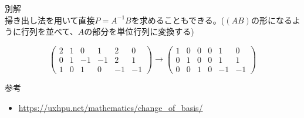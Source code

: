 \documentclass{jlreq}
\begin{document}
\begin{problem}
  別解 \\
  掃き出し法を用いて直接$P = A^{-1} B$を求めることもできる。($(A B)$の形になるように行列を並べて、$A$の部分を単位行列に変換する)

  \begin{equation*}
    \begin{pmatrix}
      2 & 1 & 0 & 1 & 2 & 0 \\
      0 & 1 & -1 & -1 & 2 & 1 \\
      1 & 0 & 1 & 0 & -1 & -1
    \end{pmatrix} \to \begin{pmatrix}
      1 & 0 & 0 & 0 & 1 & 0 \\
      0 & 1 & 0 & 0 & 1 & 1 \\
      0 & 0 & 1 & 0 & -1 & -1
    \end{pmatrix}
  \end{equation*}
\end{problem}

参考
\begin{itemize}
  \item \url{https://uxhpu.net/mathematics/change_of_basis/}
\end{itemize}
\end{document}
